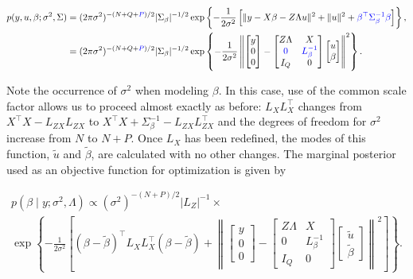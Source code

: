 \documentclass[article,shortnames]{jss}
\begin{document}
\begin{align*}
  p(y, u, \beta; \sigma^2, \Sigma) & = (2\pi\sigma^2)^{-(N+Q+{\color{blue}P})/2}
  |\Sigma_\beta|^{-1/2} \exp\left\{-\frac{1}{2\sigma^2}\left[\|y - X\beta - Z \Lambda u
      \|^2 + \|u\|^2 + {\color{blue}\beta^\top\Sigma_\beta^{-1}\beta}\right]\right\}, \\
  & = (2\pi\sigma^2)^{-(N+Q+ {\color{blue}P})/2}|\Sigma_\beta|^{-1/2} \exp\left\{-\frac{1}{2\sigma^2}
    \left\|\begin{bmatrix}y \\ 0 \\ 0\end{bmatrix} -
      \begin{bmatrix} Z \Lambda & X \\ {\color{blue} 0} & {\color{blue}L_\beta^{-1}} \\ I_Q & 0 \end{bmatrix}
      \begin{bmatrix} u \\ \beta \end{bmatrix}\right\|^2\right\}.
\end{align*}

Note the occurrence of $\sigma^2$ when modeling $\beta$. In this
case, use of the common scale factor allows us to proceed almost
exactly as before:
$L_XL_X^\top$ changes from $X^\top X - L_{ZX}L_{ZX}$ to $X^\top X + \Sigma_\beta^{-1} -
L_{ZX}L_{ZX}^\top$ and 
the degrees of freedom for $\sigma^2$ increase from $N$ to $N +
P$. Once $L_X$ has been redefined, the modes of this function,
$\tilde{u}$ and $\tilde{\beta}$, are calculated with no other
changes. The marginal posterior used as an objective function for optimization
is given by

\begin{multline*}
  p(\beta \mid y; \sigma^2, \Lambda) \propto
  (\sigma^2)^{-(N+P)/2}|L_Z|^{-1} \times \\
  \exp\left\{-\frac{1}{2\sigma^2} \left[ (\beta - \tilde\beta)^\top
      L_XL_X^\top (\beta - \tilde\beta) + \left\|\begin{bmatrix}y \\ 0 \\ 0\end{bmatrix} -
      \begin{bmatrix} Z \Lambda & X \\ 0 & L_\beta^{-1} \\ I_Q & 0 \end{bmatrix}
      \begin{bmatrix} \tilde{u} \\ \tilde\beta \end{bmatrix}\right\|^2\right] \right\}.
\end{multline*}
\end{document}
